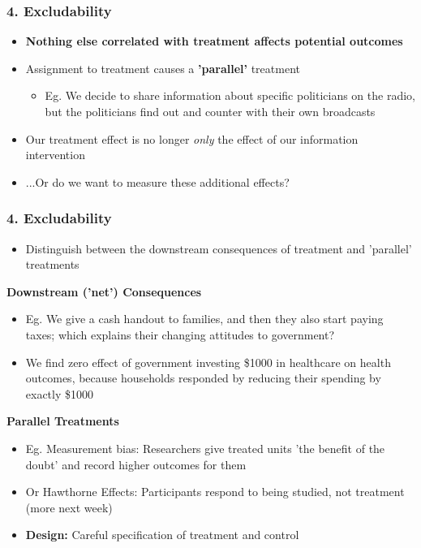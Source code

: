 \documentclass[xcolor=x11names,compress]{beamer}\usepackage[]{graphicx}\usepackage[]{color}
\renewcommand{\(}{\begin{columns}}
\renewcommand{\)}{\end{columns}}
\newcommand{\<}[1]{\begin{column}{#1}}
\renewcommand{\>}{\end{column}}
\begin{document}
\begin{frame}
\frametitle{4. Excludability}
\begin{itemize}
\item \textbf{Nothing else correlated with treatment affects potential outcomes}
\pause
\item Assignment to treatment causes a \textbf{'parallel'} treatment
\pause
\begin{itemize}
\item Eg. We decide to share information about specific politicians on the radio, but the politicians find out and counter with their own broadcasts
\end{itemize}
\pause
\item Our treatment effect is no longer \textit{only} the effect of our information intervention
\pause
\item ...Or do we want to measure these additional effects?
\end{itemize}
\end{frame}

\begin{frame}
\frametitle{4. Excludability}
\begin{itemize}
\item Distinguish between the downstream consequences of treatment and 'parallel' treatments
\end{itemize}
\pause
\footnotesize
\begin{multicols}{2}
\textbf{Downstream ('net') Consequences}
\begin{itemize}
\pause
\item Eg. We give a cash handout to families, and then they also start paying taxes; which explains their changing attitudes to government?
\pause
\item We find zero effect of government investing \$1000 in healthcare on health outcomes, because households responded by reducing their spending by exactly \$1000
\end{itemize}
\columnbreak
\pause
\textbf{Parallel Treatments}
\begin{itemize}
\pause
\item Eg. Measurement bias: Researchers give treated units 'the benefit of the doubt' and record higher outcomes for them
\pause
\item Or Hawthorne Effects: Participants respond to being studied, not treatment (more next week)
\end{itemize}
\end{multicols}
\normalsize
\begin{itemize}
\pause
\item \textbf{Design:} Careful specification of treatment and control
\end{itemize}
\end{frame} 
\end{document}

